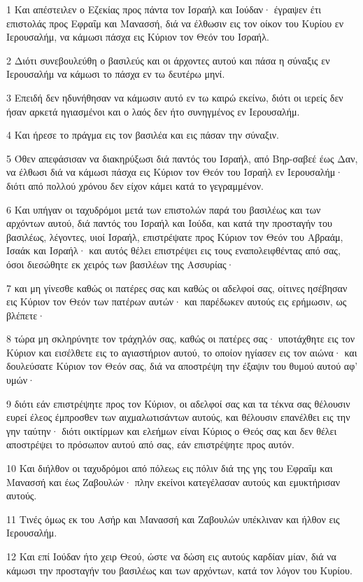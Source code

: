 \par 1 Και απέστειλεν ο Εζεκίας προς πάντα τον Ισραήλ και Ιούδαν· έγραψεν έτι επιστολάς προς Εφραΐμ και Μανασσή, διά να έλθωσιν εις τον οίκον του Κυρίου εν Ιερουσαλήμ, να κάμωσι πάσχα εις Κύριον τον Θεόν του Ισραήλ.
\par 2 Διότι συνεβουλεύθη ο βασιλεύς και οι άρχοντες αυτού και πάσα η σύναξις εν Ιερουσαλήμ να κάμωσι το πάσχα εν τω δευτέρω μηνί.
\par 3 Επειδή δεν ηδυνήθησαν να κάμωσιν αυτό εν τω καιρώ εκείνω, διότι οι ιερείς δεν ήσαν αρκετά ηγιασμένοι και ο λαός δεν ήτο συνηγμένος εν Ιερουσαλήμ.
\par 4 Και ήρεσε το πράγμα εις τον βασιλέα και εις πάσαν την σύναξιν.
\par 5 Όθεν απεφάσισαν να διακηρύξωσι διά παντός του Ισραήλ, από Βηρ-σαβεέ έως Δαν, να έλθωσι διά να κάμωσι πάσχα εις Κύριον τον Θεόν του Ισραήλ εν Ιερουσαλήμ· διότι από πολλού χρόνου δεν είχον κάμει κατά το γεγραμμένον.
\par 6 Και υπήγαν οι ταχυδρόμοι μετά των επιστολών παρά του βασιλέως και των αρχόντων αυτού, διά παντός του Ισραήλ και Ιούδα, και κατά την προσταγήν του βασιλέως, λέγοντες, υιοί Ισραήλ, επιστρέψατε προς Κύριον τον Θεόν του Αβραάμ, Ισαάκ και Ισραήλ· και αυτός θέλει επιστρέψει εις τους εναπολειφθέντας από σας, όσοι διεσώθητε εκ χειρός των βασιλέων της Ασσυρίας·
\par 7 και μη γίνεσθε καθώς οι πατέρες σας και καθώς οι αδελφοί σας, οίτινες ησέβησαν εις Κύριον τον Θεόν των πατέρων αυτών· και παρέδωκεν αυτούς εις ερήμωσιν, ως βλέπετε·
\par 8 τώρα μη σκληρύνητε τον τράχηλόν σας, καθώς οι πατέρες σας· υποτάχθητε εις τον Κύριον και εισέλθετε εις το αγιαστήριον αυτού, το οποίον ηγίασεν εις τον αιώνα· και δουλεύσατε Κύριον τον Θεόν σας, διά να αποστρέψη την έξαψιν του θυμού αυτού αφ' υμών·
\par 9 διότι εάν επιστρέψητε προς τον Κύριον, οι αδελφοί σας και τα τέκνα σας θέλουσιν ευρεί έλεος έμπροσθεν των αιχμαλωτισάντων αυτούς, και θέλουσιν επανέλθει εις την γην ταύτην· διότι οικτίρμων και ελεήμων είναι Κύριος ο Θεός σας και δεν θέλει αποστρέψει το πρόσωπον αυτού από σας, εάν επιστρέψητε προς αυτόν.
\par 10 Και διήλθον οι ταχυδρόμοι από πόλεως εις πόλιν διά της γης του Εφραΐμ και Μανασσή και έως Ζαβουλών· πλην εκείνοι κατεγέλασαν αυτούς και εμυκτήρισαν αυτούς.
\par 11 Τινές όμως εκ του Ασήρ και Μανασσή και Ζαβουλών υπέκλιναν και ήλθον εις Ιερουσαλήμ.
\par 12 Και επί Ιούδαν ήτο χειρ Θεού, ώστε να δώση εις αυτούς καρδίαν μίαν, διά να κάμωσι την προσταγήν του βασιλέως και των αρχόντων, κατά τον λόγον του Κυρίου.
